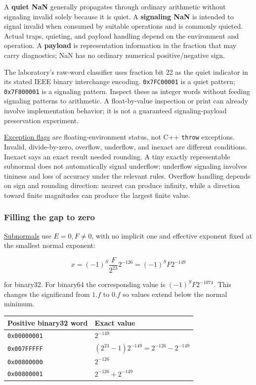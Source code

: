 A \textbf{quiet NaN} generally propagates through ordinary arithmetic without signaling invalid solely because it is quiet. A \textbf{signaling NaN} is intended to signal invalid when consumed by suitable operations and is commonly quieted. Actual traps, quieting, and payload handling depend on the environment and operation. A \textbf{payload} is representation information in the fraction that may carry diagnostics; NaN has no ordinary numerical positive/negative sign.

The laboratory's raw-word classifier uses fraction bit 22 as the quiet indicator in its stated IEEE binary interchange encoding. \texttt{0x7FC00001} is a quiet pattern; \texttt{0x7F800001} is a signaling pattern. Inspect these as integer words without feeding signaling patterns to arithmetic. A float-by-value inspection or print can already involve implementation behavior; it is not a guaranteed signaling-payload preservation experiment.

\hyperref[appendix-ed8531b46754]{Exception flags} are floating-environment status, not C++ \texttt{throw} exceptions. Invalid, divide-by-zero, overflow, underflow, and inexact are different conditions. Inexact says an exact result needed rounding. A tiny exactly representable subnormal does not automatically signal underflow; underflow signaling involves tininess and loss of accuracy under the relevant rules. Overflow handling depends on sign and rounding direction: nearest can produce infinity, while a direction toward finite magnitudes can produce the largest finite value.

\subsubsection{Filling the gap to zero}\label{05-engine-i-ch001-filling-the-gap-to-zero}

\hyperref[appendix-00a6e044c437]{Subnormals} use \(E=0,F\ne0\), with no implicit one and effective exponent fixed at the smallest normal exponent:

\[
x=(-1)^S\frac{F}{2^{23}}2^{-126}=(-1)^S F2^{-149}
\]

for binary32. For binary64 the corresponding value is \((-1)^S F2^{-1074}\). This changes the significand from \(1.f\) to \(0.f\) so values extend below the normal minimum.

{\def\LTcaptype{none} %
\begin{longtable}[]{@{}ll@{}}
\toprule\noalign{}
Positive binary32 word & Exact value \\
\midrule\noalign{}
\endhead
\bottomrule\noalign{}
\endlastfoot
\texttt{0x00000001} & \(2^{-149}\) \\
\texttt{0x007FFFFF} & \((2^{23}-1)2^{-149}=2^{-126}-2^{-149}\) \\
\texttt{0x00800000} & \(2^{-126}\) \\
\texttt{0x00800001} & \(2^{-126}+2^{-149}\) \\
\end{longtable}
}

